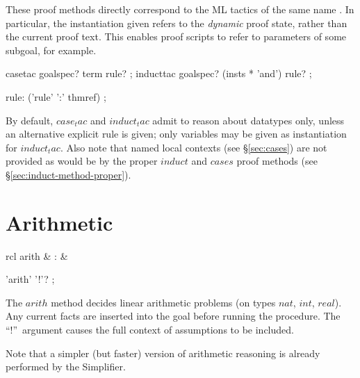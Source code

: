 These proof methods directly correspond to the ML tactics of the same name
\cite{isabelle-HOL}.  In particular, the instantiation given refers to the
\emph{dynamic} proof state, rather than the current proof text.  This enables
proof scripts to refer to parameters of some subgoal, for example.


\begin{rail}
  casetac goalspec? term rule?
  ;
  inducttac goalspec? (insts * 'and') rule?
  ;

  rule: ('rule' ':' thmref)
  ;
\end{rail}

By default, $case_tac$ and $induct_tac$ admit to reason about datatypes only,
unless an alternative explicit rule is given; only variables may be given as
instantiation for $induct_tac$.  Also note that named local contexts (see
\S\ref{sec:cases}) are not provided as would be by the proper $induct$ and
$cases$ proof methods (see \S\ref{sec:induct-method-proper}).


\section{Arithmetic}

\begin{matharray}{rcl}
  arith & : & \isarmeth \\
\end{matharray}

\begin{rail}
  'arith' '!'?
  ;
\end{rail}

The $arith$ method decides linear arithmetic problems (on types $nat$, $int$,
$real$).  Any current facts are inserted into the goal before running the
procedure.  The ``!''~argument causes the full context of assumptions to be
included.

Note that a simpler (but faster) version of arithmetic reasoning is already
performed by the Simplifier.


